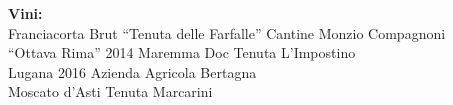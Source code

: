\documentclass[11pt]{book}
\begin{document}
\vfill
\noindent\scriptsize\textbf{Vini:}\\
Franciacorta Brut “Tenuta delle Farfalle” Cantine Monzio Compagnoni\\
\footnotesize“Ottava Rima” 2014 Maremma Doc Tenuta L’Impostino\\
Lugana 2016 Azienda Agricola Bertagna\\
Moscato d’Asti Tenuta Marcarini\\

\begin{figure}[h!]
\centering
\def\svgscale{0.5}
\end{figure}
\end{document}
